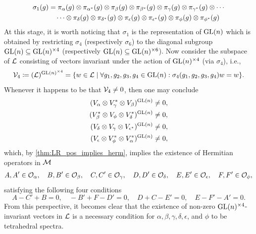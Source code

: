 \documentclass[notitlepage, 10pt]{article}
\begin{document}
\begin{rem}
\begin{align}
        \begin{split}
            \label{eq:one_fold_action}
            \sigma_{1}(g)
            &= \pi_{\alpha}(g) \otimes \pi_{\alpha^*}(g) \otimes \pi_{\beta}(g) \otimes \pi_{\beta^*}(g) \otimes \pi_{\gamma}(g) \otimes \pi_{\gamma^*}(g) \otimes \cdots \\ &\quad\cdots\otimes\pi_{\delta}(g) \otimes \pi_{\delta^*}(g) \otimes \pi_{\epsilon}(g) \otimes \pi_{\epsilon^*}(g) \otimes \pi_{\phi}(g) \otimes \pi_{\phi^*}(g)
        \end{split}
    \end{align}
    At this stage, it is worth noticing that $\sigma_1$ is the representation of $\operatorname{GL}(n)$ which is obtained by restricting $\sigma_4$ (respectively $\sigma_6$) to the diagonal subgroup $\operatorname{GL}(n) \subseteq \operatorname{GL}(n)^{\times 4}$ (respectively $\operatorname{GL}(n) \subseteq \operatorname{GL}(n)^{\times 6}$).
    Now consider the subspace of $\mathcal L$ consisting of vectors invariant under the action of $\operatorname{GL}(n)^{\times 4}$ (via $\sigma_4$), i.e.,
    \begin{equation}
        \mathcal V_{4} \coloneqq (\mathcal L)^{\operatorname{GL}(n)^{\times 4}} = \{ w \in \mathcal L \mid \forall g_1, g_2, g_3, g_4 \in \operatorname{GL}(n) : \sigma_{4}(g_1, g_2, g_3, g_4) w = w \}.
    \end{equation}
    Whenever it happens to be that $\mathcal V_{4} \neq 0$, then one may conclude
    \begin{align}
        \begin{split}
            \label{eq:face_inv}
            (V_{\alpha} \otimes V_{\gamma}^{*} \otimes V_{\beta})^{\operatorname{GL}(n)} &\neq 0, \\
            (V_{\beta}^{*}  \otimes V_{\phi} \otimes V_{\delta}^{*})^{\operatorname{GL}(n)} &\neq 0, \\
            (V_{\delta} \otimes V_{\gamma} \otimes V_{\epsilon^{*}})^{\operatorname{GL}(n)} &\neq 0, \\
            (V_{\epsilon} \otimes V_{\phi}^{*}  \otimes V_{\alpha}^{*})^{\operatorname{GL}(n)} &\neq 0,
        \end{split}
    \end{align}
    which, by \cref{thm:LR_pos_implies_herm}, implies the existence of Hermitian operators in $\mathcal M$
    \begin{equation}
        \label{eq:prime_unprime}
        A, A' \in \mathcal O_{\alpha}, \quad
        B, B' \in \mathcal O_{\beta}, \quad
        C, C' \in \mathcal O_{\gamma}, \quad
        D, D' \in \mathcal O_{\delta}, \quad
        E, E' \in \mathcal O_{\epsilon}, \quad
        F, F' \in \mathcal O_{\phi},
    \end{equation}
    satisfying the following four conditions
    \begin{equation}
        A - C' + B = 0, \quad
        - B' + F - D' = 0, \quad
        D + C - E' = 0, \quad
        E - F' - A' = 0.
    \end{equation}
    From this perspective, it becomes clear that the existence of non-zero $\operatorname{GL}(n)^{\times 4}$-invariant vectors in $\mathcal L$ is a necessary condition for $\alpha,\beta, \gamma, \delta, \epsilon$, and $\phi$ to be tetrahedral spectra.
\end{rem}
\end{document}
